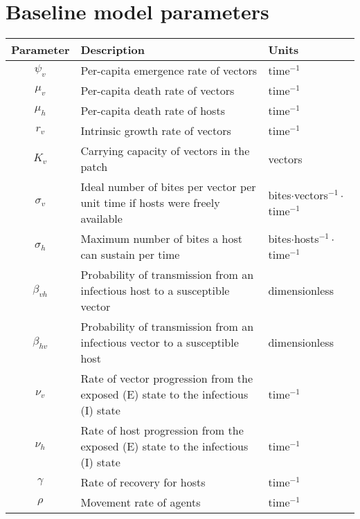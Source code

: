 \section{Baseline model parameters}\label{appendix:manore-abm}

\begin{table}[h]
    \centering
    \begin{adjustbox}{center}
        \footnotesize
        \begin{tabular}{cll} \toprule
            {Parameter} & {Description} & {Units} \\ \midrule
            $\psi_v$  & Per-capita emergence rate of vectors & time$^{-1}$ \\
            $\mu_v$  & Per-capita death rate of vectors  & time$^{-1}$ \\
            $\mu_h$  & Per-capita death rate of hosts  & time$^{-1}$ \\
            $r_v$  & Intrinsic growth rate of vectors & time$^{-1}$ \\
            $K_v$  & Carrying capacity of vectors in the patch  & vectors \\
            $\sigma_v$  & Ideal number of bites per vector per unit time if hosts were freely available & bites$\cdot$vectors$^{-1}\cdot$time$^{-1}$ \\
            $\sigma_h$  & Maximum number of bites a host can sustain per time & bites$\cdot$hosts$^{-1}\cdot$time$^{-1}$ \\
            $\beta_{vh}$  & Probability of transmission from an infectious host to a susceptible vector  & dimensionless \\
            $\beta_{hv}$  & Probability of transmission from an infectious vector to a susceptible host  & dimensionless \\
            $\nu_v$  & Rate of vector progression from the exposed (E) state to the infectious (I) state  & time$^{-1}$ \\
            $\nu_h$  & Rate of host progression from the exposed (E) state to the infectious (I) state  & time$^{-1}$ \\
            $\gamma$ & Rate of recovery for hosts & time$^{-1}$ \\
            $\rho$ & Movement rate of agents & time$^{-1}$ \\ \bottomrule
        \end{tabular}
    \end{adjustbox}
    \label{table:manore-params}
\end{table}
